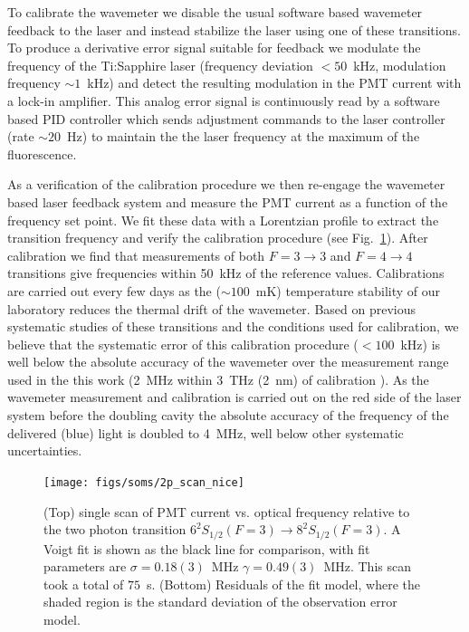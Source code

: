 \documentclass[%
 amsmath,amssymb,
aps,
]{revtex4-2}
\begin{document}
To calibrate the wavemeter we disable the usual software based wavemeter feedback to the laser and instead stabilize the laser using one of these transitions. To produce a derivative error signal suitable for feedback we modulate the frequency of the Ti:Sapphire laser (frequency deviation $<50$~kHz, modulation frequency $\sim1$~kHz) and detect the resulting modulation in the PMT current with a lock-in amplifier. This analog error signal is continuously read by a software based PID controller which sends adjustment commands to the laser controller (rate $\sim20$~Hz) to maintain the the laser frequency at the maximum of the fluorescence.

As a verification of the calibration procedure we then re-engage the wavemeter based laser feedback system and measure the PMT current as a function of the frequency set point. We fit these data with a Lorentzian profile to extract the transition frequency and verify the calibration procedure (see Fig.~\ref{fig:2p_scan_single}). After calibration we find that measurements of both $F=3\rightarrow3$ and $F=4\rightarrow4$ transitions give frequencies within 50~kHz of the reference values.
Calibrations are carried out every few days as the ($\sim100$~mK) temperature stability of our laboratory reduces the thermal drift of the wavemeter.
Based on previous systematic studies of these transitions \cite{Wu:13,Fendel:07} and the conditions used for calibration, we believe that the systematic error of this calibration procedure ($<100$~kHz) is well below the absolute accuracy of the wavemeter over the measurement range used in the this work (2~MHz within 3~THz (2~nm) of calibration \cite{wstechnical}). As the wavemeter measurement and calibration is carried out on the red side of the laser system before the doubling cavity the absolute accuracy of the frequency of the delivered (blue) light is doubled to 4~MHz, well below other systematic uncertainties.



\begin{figure}
    \centering
    \texttt{[image: figs/soms/2p\_scan\_nice]}
    \caption{(Top) single scan of PMT current vs. optical frequency relative to the two photon transition $6^{2}S_{1/2} (F=3) \rightarrow 8^{2}S_{1/2} (F=3)$. A Voigt fit is shown as the black line for comparison, with fit parameters are $\sigma=0.18(3)$~MHz $\gamma=0.49(3)$~MHz. This scan took a total of \(75\)~s. (Bottom) Residuals of the fit model, where the shaded region is the standard deviation of the observation error model. 
    }
    \label{fig:2p_scan_single}
\end{figure}
\end{document}
